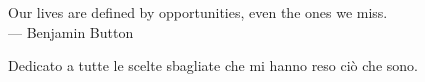 \cleardoublepage
{}
\thispagestyle{empty}

\vspace*{3cm}

\begin{center}
    Our lives are defined by opportunities, even the ones we miss. \\ \medskip
    --- Benjamin Button
\end{center}

\medskip

\begin{center}
    Dedicato a tutte le scelte sbagliate che mi hanno reso ciò che sono.
\end{center}
